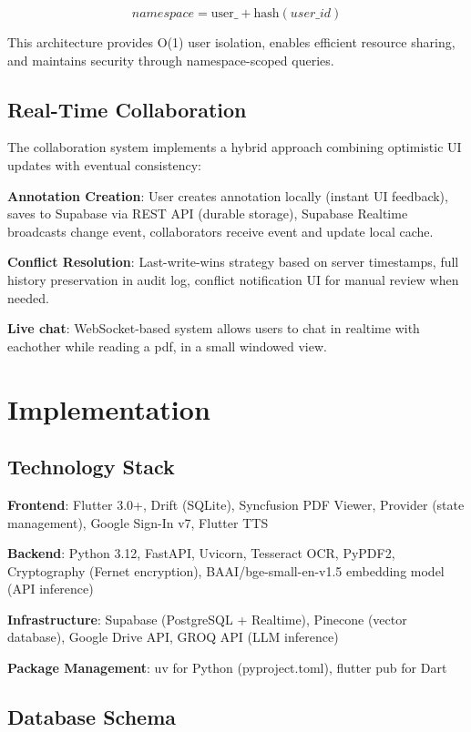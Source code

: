 \documentclass[conference]{IEEEtran}
\begin{document}
\begin{equation}
namespace = \text{user\_} + \text{hash}(user\_id)
\end{equation}


This architecture provides O(1) user isolation, enables efficient resource sharing, and maintains security through namespace-scoped queries.

\subsection{Real-Time Collaboration}

The collaboration system implements a hybrid approach combining optimistic UI updates with eventual consistency:

\textbf{Annotation Creation}: User creates annotation locally (instant UI feedback), saves to Supabase via REST API (durable storage), Supabase Realtime broadcasts change event, collaborators receive event and update local cache.

\textbf{Conflict Resolution}: Last-write-wins strategy based on server timestamps, full history preservation in audit log, conflict notification UI for manual review when needed.

\textbf{Live chat}: WebSocket-based system allows users to chat in realtime with eachother while reading a pdf, in a small windowed view.

\section{Implementation}

\subsection{Technology Stack}

\textbf{Frontend}: Flutter 3.0+, Drift (SQLite), Syncfusion PDF Viewer, Provider (state management), Google Sign-In v7, Flutter TTS

\textbf{Backend}: Python 3.12, FastAPI, Uvicorn, Tesseract OCR, PyPDF2, Cryptography (Fernet encryption), BAAI/bge-small-en-v1.5 embedding model (API inference)

\textbf{Infrastructure}: Supabase (PostgreSQL + Realtime), Pinecone (vector database), Google Drive API, GROQ API (LLM inference)

\textbf{Package Management}: uv for Python (pyproject.toml), flutter pub for Dart

\subsection{Database Schema}
\end{document}
